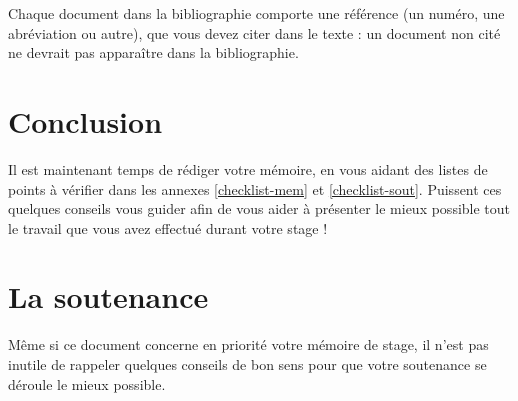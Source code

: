 \documentclass [twoside,openright,a4paper,11pt,french] {report}
\begin{document}
Chaque document dans la bibliographie comporte une référence (un
numéro, une abréviation ou autre), que vous devez citer dans le texte :
un document non cité ne devrait pas apparaître dans la bibliographie.


\chapter {Conclusion}
    \label {chap:conc}

Il est maintenant temps de rédiger votre mémoire, en vous aidant des
listes de points à vérifier dans les annexes \ref{checklist-mem} et
\ref{checklist-sout}. Puissent ces quelques
conseils vous guider afin de vous aider à présenter le mieux possible
tout le travail que vous avez effectué durant votre stage !



\appendix
\chapter {La soutenance}

Même si ce document concerne en priorité votre mémoire de stage,
il n'est pas inutile de rappeler quelques conseils de bon sens
pour que votre soutenance se déroule le mieux possible.
\end{document}
